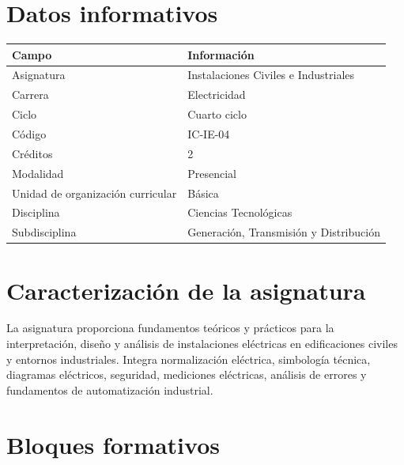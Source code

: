 \documentclass[
  spanish,
  letterpaper,
  DIV=11,
  numbers=noendperiod]{scrreprt}
\newcounter{none} %
\begin{document}
\section{Datos informativos}\label{datos-informativos}

{\def\LTcaptype{none} %
\begin{longtable}[]{@{}ll@{}}
\toprule\noalign{}
Campo & Información \\
\midrule\noalign{}
\endhead
\bottomrule\noalign{}
\endlastfoot
Asignatura & Instalaciones Civiles e Industriales \\
Carrera & Electricidad \\
Ciclo & Cuarto ciclo \\
Código & IC-IE-04 \\
Créditos & 2 \\
Modalidad & Presencial \\
Unidad de organización curricular & Básica \\
Disciplina & Ciencias Tecnológicas \\
Subdisciplina & Generación, Transmisión y Distribución \\
\end{longtable}
}

\section{Caracterización de la
asignatura}\label{caracterizaciuxf3n-de-la-asignatura}

La asignatura proporciona fundamentos teóricos y prácticos para la
interpretación, diseño y análisis de instalaciones eléctricas en
edificaciones civiles y entornos industriales. Integra normalización
eléctrica, simbología técnica, diagramas eléctricos, seguridad,
mediciones eléctricas, análisis de errores y fundamentos de
automatización industrial.

\section{Bloques formativos}\label{bloques-formativos}
\end{document}
